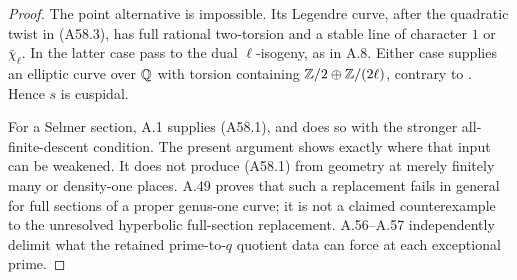 \begin{proof}
The point alternative is impossible. Its Legendre curve, after the
quadratic twist in (A58.3), has full rational two-torsion and a stable
line of character $1$ or $\bar\chi_\ell$. In the latter case pass to
the dual $\ell$-isogeny, as in A.8. Either case supplies an elliptic
curve over $\mathbb Q$ with torsion containing
$\mathbb Z/2\oplus\mathbb Z/(2\ell)$, contrary to
\citet[Theorem (8)]{AMMazur1977}. Hence $s$ is cuspidal.

For a Selmer section, A.1 supplies (A58.1), and does so with the
stronger all-finite-descent condition. The present argument shows
exactly where that input can be weakened. It does not produce
(A58.1) from geometry at merely finitely many or density-one places.
A.49 proves that such a replacement fails in general for full
sections of a proper genus-one curve; it is not a claimed counterexample
to the unresolved hyperbolic full-section replacement. A.56--A.57
independently delimit what the retained prime-to-$q$ quotient data can
force at each exceptional prime.
\end{proof}
